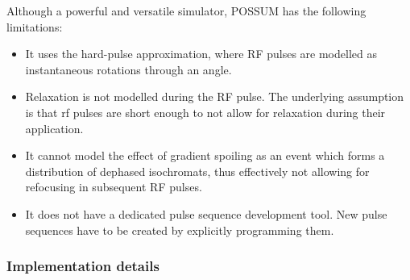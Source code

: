 Although a powerful and versatile simulator, POSSUM has the following limitations:
\begin{itemize}
    
    \item It uses the hard-pulse approximation, where RF pulses are modelled as instantaneous rotations through an angle.
    
    \item Relaxation is not modelled during the RF pulse.
    The underlying assumption is that \ac{rf} pulses are short enough to not allow for relaxation during their application. 
    
    \item It cannot model the effect of gradient spoiling as an event which forms a distribution of dephased isochromats, thus effectively not allowing for refocusing in subsequent RF pulses.
    
    \item It does not have a dedicated pulse sequence development tool. 
    New pulse sequences have to be created by explicitly programming them.
    
\end{itemize}

\hfill

\subsubsection{Implementation details}


